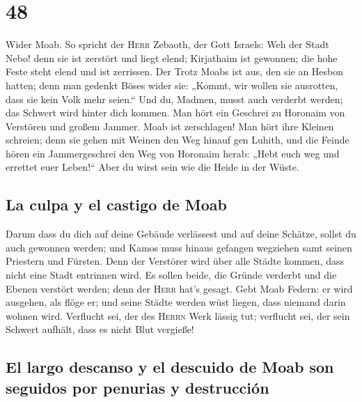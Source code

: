 \hypertarget{section-47}{%
\section{48}\label{section-47}}

 Wider Moab. So spricht der \textsc{Herr} Zebaoth, der
Gott Israels: Weh der Stadt Nebo! denn sie ist zerstört und liegt elend;
Kirjathaim ist gewonnen; die hohe Feste steht elend und ist zerrissen.
 Der Trotz Moabs ist aus, den sie an Hesbon hatten; denn
man gedenkt Böses wider sie: „Kommt, wir wollen sie ausrotten, dass sie
kein Volk mehr seien.`` Und du, Madmen, musst auch verderbt werden; das
Schwert wird hinter dich kommen.  Man hört ein Geschrei zu
Horonaim von Verstören und großem Jammer.  Moab ist
zerschlagen! Man hört ihre Kleinen schreien;  denn sie
gehen mit Weinen den Weg hinauf gen Luhith, und die Feinde hören ein
Jammergeschrei den Weg von Horonaim herab:  „Hebt euch weg
und errettet euer Leben!{}`` Aber du wirst sein wie die Heide in der
Wüste.

\hypertarget{la-culpa-y-el-castigo-de-moab}{%
\subsection{La culpa y el castigo de
Moab}\label{la-culpa-y-el-castigo-de-moab}}

 Darum dass du dich auf deine Gebäude verlässest und auf
deine Schätze, sollst du auch gewonnen werden; und Kamos muss hinaus
gefangen wegziehen samt seinen Priestern und Fürsten. 
Denn der Verstörer wird über alle Städte kommen, dass nicht eine Stadt
entrinnen wird. Es sollen beide, die Gründe verderbt und die Ebenen
verstört werden; denn der \textsc{Herr} hat's gesagt. 
Gebt Moab Federn: er wird ausgehen, als flöge er; und seine Städte
werden wüst liegen, dass niemand darin wohnen wird. 
Verflucht sei, der des \textsc{Herrn} Werk lässig tut; verflucht sei,
der sein Schwert aufhält, dass es nicht Blut vergieße!

\hypertarget{el-largo-descanso-y-el-descuido-de-moab-son-seguidos-por-penurias-y-destrucciuxf3n}{%
\subsection{El largo descanso y el descuido de Moab son seguidos por
penurias y
destrucción}\label{el-largo-descanso-y-el-descuido-de-moab-son-seguidos-por-penurias-y-destrucciuxf3n}}

